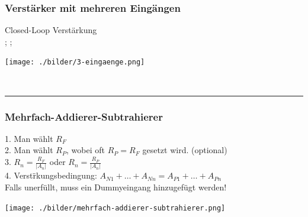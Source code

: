 		\subsubsection{Verstärker mit mehreren Eingängen}
			\begin{minipage}[T]{13cm}
                Closed-Loop Verst\"arkung
                \hspace{3mm}\\
            	\hspace*{43mm}
            	;\hspace{0.3mm}
            	;\hspace{0.3mm}\\
            \end{minipage}
			\begin{minipage}{6cm}
            	\texttt{[image: ./bilder/3-eingaenge.png]}
            \end{minipage}\\
\hrule

		\subsubsection{Mehrfach-Addierer-Subtrahierer} 		
        \begin{minipage}[T]{13cm}
            1. Man w\"ahlt $R_{F}$\\
            2. Man w\"ahlt $R_{P}$, wobei oft $R_{P}=R_{F}$ gesetzt wird. (optional)\\
            3. $R_{n}=\frac{R_{F}}{\left|A_{n}\right|}$ oder
            $R_{n}=\frac{R_{P}}{\left|A_{n}\right|}$\\ 
            4. Verst\"rkungsbedingung: $A_{N1} +
            \ldots + A_{Nn} = A_{P1} + \ldots + A_{Pn}$ \\Falls unerf\"ullt, muss ein Dummyeingang hinzugefügt werden!
        \end{minipage}
        \begin{minipage}{6cm}
            \texttt{[image: ./bilder/mehrfach-addierer-subtrahierer.png]} 
        \end{minipage}\\
\newpage
        
